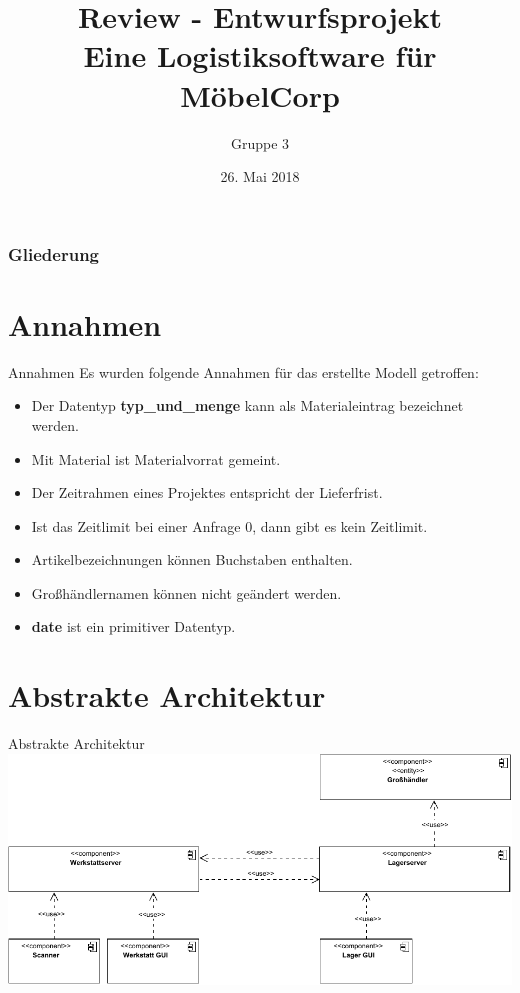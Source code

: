 \documentclass{beamer}
\begin{document}
			
	
	\title[Review - Entwurfsprojekt]{Review - Entwurfsprojekt\\ Eine Logistiksoftware für MöbelCorp}
	\author{Gruppe 3}
	
	 \begin{frame}[title=Hauptgebaeude_Nacht.jpg]
	 	\maketitle
	 	\date{26. Mai 2018}
 	\end{frame}
	 
	\begin{frame}
		\frametitle{Gliederung}
		\tableofcontents
	\end{frame}
	\section*{Annahmen}
	\begin{frame}{Annahmen}
	Es wurden folgende Annahmen für das erstellte Modell getroffen:
	\begin{itemize}
		\item Der Datentyp \textbf{typ\_und\_menge} kann als Materialeintrag bezeichnet werden.
		\item Mit Material ist Materialvorrat gemeint.
		\item Der Zeitrahmen eines Projektes entspricht der Lieferfrist.
		\item Ist das Zeitlimit bei einer Anfrage 0, dann gibt es kein Zeitlimit.
		\item Artikelbezeichnungen können Buchstaben enthalten.
		\item Großhändlernamen können nicht geändert werden.
		\item \textbf{date} ist ein primitiver Datentyp.
	\end{itemize}
	\end{frame}
	\section{Abstrakte Architektur}
	\begin{frame}{Abstrakte Architektur}
		\includegraphics[width=\textwidth]{PDF/abstrakte_Architektur.pdf}
	\end{frame}
\end{document}
